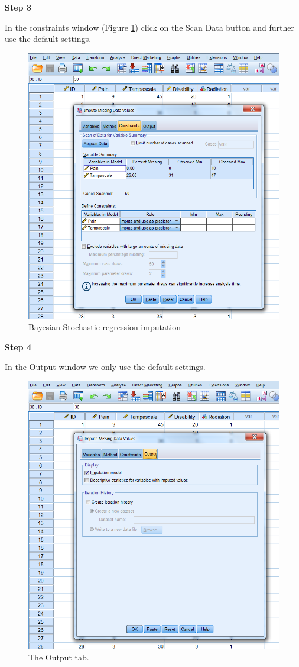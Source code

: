 \documentclass[]{book}
\begin{document}
\textbf{Step 3}

In the constraints window (Figure \ref{fig:fig3-20}) click on the Scan
Data button and further use the default settings.

\begin{figure}

{\centering \includegraphics[width=0.7\linewidth]{images/fig3.20} 

}

\caption{Bayesian Stochastic regression imputation}\label{fig:fig3-20}
\end{figure}

\textbf{Step 4}

In the Output window we only use the default settings.

\begin{figure}

{\centering \includegraphics[width=0.7\linewidth]{images/fig3.21} 

}

\caption{The Output tab.}\label{fig:fig3-21}
\end{figure}
\end{document}
